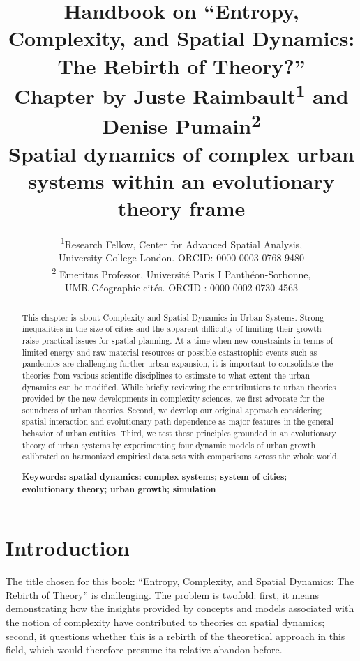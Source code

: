 \documentclass[10pt,letterpaper]{article}
\title{\textbf{Handbook on ``Entropy, Complexity, and Spatial Dynamics: The Rebirth of Theory?''}\medskip\\
Chapter by Juste Raimbault\textsuperscript{1} and Denise Pumain\textsuperscript{2}\medskip\\
\textbf{Spatial dynamics of complex urban systems within an evolutionary theory frame}}
\date{}
\author{\textsuperscript{1}Research Fellow, Center for Advanced Spatial Analysis,\\
University College London. ORCID: 0000-0003-0768-9480\\
\textsuperscript{2} Emeritus Professor, Universit{\'e} Paris I Panth{\'e}on-Sorbonne,\\
UMR G{\'e}ographie-cit{\'e}s. ORCID : 0000-0002-0730-4563}
\begin{document}
\maketitle


\begin{abstract}
This chapter is about Complexity and Spatial Dynamics in Urban Systems. Strong inequalities in the size of cities and the apparent difficulty of limiting their growth raise practical issues for spatial planning. At a time when new constraints in terms of limited energy and raw material resources or possible catastrophic events such as pandemics are challenging further urban expansion, it is important to consolidate the theories from various scientific disciplines to estimate to what extent the urban dynamics can be modified. While briefly reviewing the contributions to urban theories provided by the new developments in complexity sciences, we first advocate for the soundness of urban theories. Second, we develop our original approach considering spatial interaction and evolutionary path dependence as major features in the general behavior of urban entities. Third, we test these principles grounded in an evolutionary theory of urban systems by experimenting four dynamic models of urban growth calibrated on harmonized empirical data sets with comparisons across the whole world.\medskip

	\textbf{Keywords: spatial dynamics; complex systems; system of cities; evolutionary theory; urban growth; simulation}
\end{abstract}


\justify



\section{Introduction}


The title chosen for this book: ``Entropy, Complexity, and Spatial Dynamics: The Rebirth of Theory'' is challenging. The problem is twofold: first, it means demonstrating how the insights provided by concepts and models associated with the notion of complexity have contributed to theories on spatial dynamics; second, it questions whether this is a rebirth of the theoretical approach in this field, which would therefore presume its relative abandon before.
\end{document}
